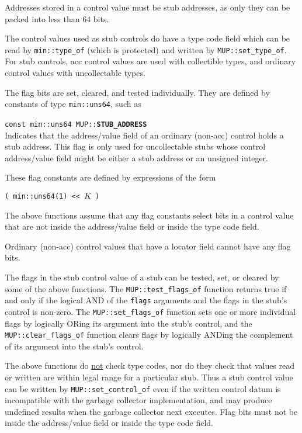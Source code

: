 \documentclass[12pt]{article}
\makeatletter
\newcommand{\ttindex}[1]{\index{#1@{\tt #1}}}
\newcommand{\MUPindex}[1]{\ttindex{MUP::#1}\ttindex{#1}}
\newenvironment{indpar}[1][0.3in]%
	{\begin{list}{}%
		     {\setlength{\itemsep}{0in}%
		      \setlength{\topsep}{0in}%
		      \setlength{\parsep}{1ex}%
		      \setlength{\labelwidth}{#1}%
		      \setlength{\leftmargin}{#1}%
		      \addtolength{\leftmargin}{\labelsep}}%
	 \item}%
	{\end{list}}
\newcommand{\LABEL}[1]{\label{#1}}
\newcommand{\MUPKEY}[1]{{\tt \bf #1}\MUPindex{#1}}
\makeatother
\begin{document}
Addresses stored in a control value must be stub addresses, as only they
can be packed into less than 64 bits.

The control values used as stub controls do have a type code field which
can be read by \verb|min::type_of| (which is protected) and
written by \verb|MUP::set_type_of|.  For stub controls,
acc control values are used with
collectible types, and ordinary control values with
uncollectable types.

The flag bits are set, cleared, and tested individually.  They are
defined by constants of type \verb|min::uns64|, such as

\begin{indpar}
\begin{list}{}{}
\item[{\tt const min::uns64 MUP::}\MUPKEY{STUB\_ADDRESS}]~%
	\LABEL{MIN::STUB_ADDRESS}\\
Indicates that the address/value field of an ordinary (non-acc)
control holds a stub address.  This flag is only used for
uncollectable stubs whose control address/value field might
be either a stub address or an unsigned integer.
\end{list}
\end{indpar}

These flag constants are defined by expressions of the form

\begin{center}
\verb|( min::uns64(1) << |$K$\verb| )|
\end{center}

The above functions assume that any flag constants select bits
in a control value that are not inside the address/value field
or inside the type code field.

Ordinary (non-acc) control values that have a locator
field cannot have any flag bits.

The flags in the stub control value of a stub can be tested, set, or
cleared by some of the above functions.
The \verb|MUP::test_flags_of| function
returns true if and only if the logical AND of the \verb|flags| arguments
and the flags in the stub's control is non-zero.  The \verb|MUP::set_flags_of|
function sets one or more individual flags by logically ORing its
argument into the stub's control, and the
\verb|MUP::clear_flags_of| function clears flags by logically ANDing
the complement of its argument into the stub's control.

The above functions do \underline{not} check type codes, nor do they check
that values read or written are within legal range for a particular
stub.  Thus a stub control value
can be written by \verb|MUP::set_control_of| even if the written
control datum is incompatible with the garbage collector implementation,
and may produce undefined results when the garbage collector
next executes.  Flag bits must not be inside the address/value field
or inside the type code field.
\end{document}
